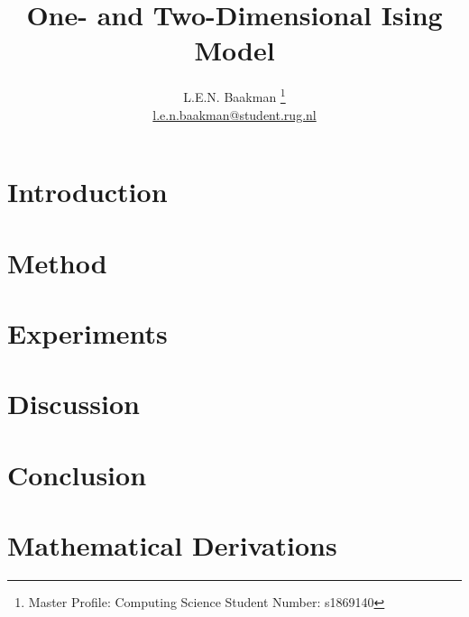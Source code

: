 \documentclass[oneside, a4paper, twocolumn, reqno, fleqn, 11pt]{article}
\title{\sc One- and Two-Dimensional Ising Model}
\author{L.E.N. Baakman%
	\thanks{%
		Master Profile: Computing Science\newline
	 	\hspace*{14pt} Student Number: s1869140%
	}\\%
	\href{mailto:l.e.n.baakman@student.rug.nl}{l.e.n.baakman@student.rug.nl}
}
\begin{document}
\maketitle

\section{Introduction}
\label{s:intro}


\section{Method}
\label{s:method}
	

\section{Experiments}
\label{s:experiment}
	

\section{Discussion}
\label{s:discussion}


\section{Conclusion}
\label{s:conclusion}


\printbibliography

\onecolumn
\allowdisplaybreaks %
\appendix
\section{Mathematical Derivations}
\label{a:derivations}

\end{document}
